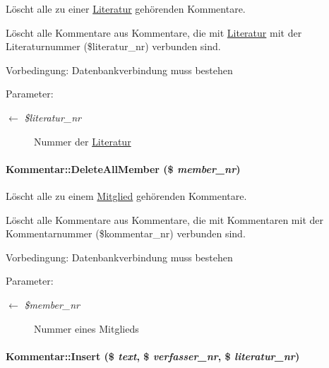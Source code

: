 Löscht alle zu einer \hyperlink{classLiteratur}{Literatur} gehörenden Kommentare. 

Löscht alle Kommentare aus Kommentare, die mit \hyperlink{classLiteratur}{Literatur} mit der Literaturnummer (\$literatur\_\-nr) verbunden sind. \begin{Desc}
\item[Vorbedingung:]Datenbankverbindung muss bestehen \end{Desc}
\begin{Desc}
\item[Parameter:]
\begin{description}
\item[\mbox{$\leftarrow$} {\em \$literatur\_\-nr}]Nummer der \hyperlink{classLiteratur}{Literatur} \end{description}
\end{Desc}
\hypertarget{classKommentar_92a8fcea1b065341c7c53e8a8464fcf0}{
\paragraph[DeleteAllMember]{\setlength{\rightskip}{0pt plus 5cm}Kommentar::Delete\-All\-Member (\$ {\em member\_\-nr})}\hfill}
\label{classKommentar_92a8fcea1b065341c7c53e8a8464fcf0}


Löscht alle zu einem \hyperlink{classMitglied}{Mitglied} gehörenden Kommentare. 

Löscht alle Kommentare aus Kommentare, die mit Kommentaren mit der Kommentarnummer (\$kommentar\_\-nr) verbunden sind. \begin{Desc}
\item[Vorbedingung:]Datenbankverbindung muss bestehen \end{Desc}
\begin{Desc}
\item[Parameter:]
\begin{description}
\item[\mbox{$\leftarrow$} {\em \$member\_\-nr}]Nummer eines Mitglieds \end{description}
\end{Desc}
\hypertarget{classKommentar_6119b3c12a61d8d5a41cded165517914}{
\paragraph[Insert]{\setlength{\rightskip}{0pt plus 5cm}Kommentar::Insert (\$ {\em text}, \$ {\em verfasser\_\-nr}, \$ {\em literatur\_\-nr})}\hfill}
\label{classKommentar_6119b3c12a61d8d5a41cded165517914}


